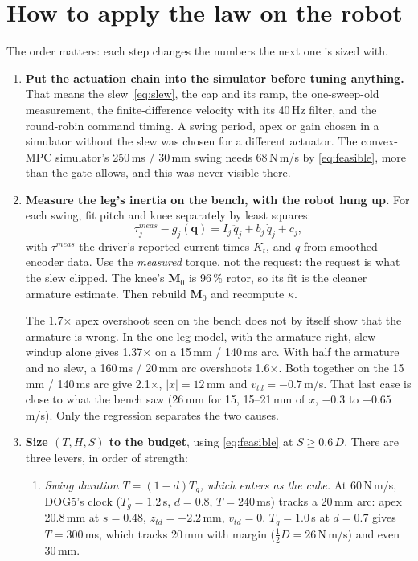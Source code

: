 \documentclass[11pt,a4paper]{article}
\newcommand{\Mmat}{\mathbf{M}}
\newcommand{\vq}{\mathbf{q}}
\newcommand{\Nms}{\,N\,m/s}
\begin{document}
\section{How to apply the law on the robot}
\label{sec:method}

The order matters: each step changes the numbers the next one is sized with.

\begin{enumerate}[leftmargin=1.6em, label=\textbf{Step \arabic*.}, ref=\arabic*]

\item \label{step:sim}\textbf{Put the actuation chain into the simulator
before tuning anything.} That means the slew~\eqref{eq:slew}, the cap and its
ramp, the one-sweep-old measurement, the finite-difference velocity with its
40\,Hz filter, and the round-robin command timing. A swing period, apex or
gain chosen in a simulator without the slew was chosen for a different
actuator. The convex-MPC simulator's 250\,ms / 30\,mm swing needs 68\Nms{} by
\eqref{eq:feasible}, more than the gate allows, and this was never visible
there.

\item \label{step:ident}\textbf{Measure the leg's inertia on the bench, with
the robot hung up.} For each swing, fit pitch and knee separately by least
squares:
\[
\tau^{meas}_j - g_j(\vq) = I_j\,\ddot q_j + b_j\,\dot q_j + c_j ,
\]
with $\tau^{meas}$ the driver's reported current times $K_t$, and $\ddot q$
from smoothed encoder data. Use the \emph{measured} torque, not the request:
the request is what the slew clipped. The knee's $\Mmat_0$ is 96\,\% rotor,
so its fit is the cleaner armature estimate. Then rebuild $\Mmat_0$ and
recompute $\kappa$.

The 1.7$\times$ apex overshoot seen on the bench does not by itself show
that the armature is wrong. In the one-leg model, with the armature right,
slew windup alone gives 1.37$\times$ on a 15\,mm / 140\,ms arc. With half
the armature and no slew, a 160\,ms / 20\,mm arc overshoots 1.6$\times$. Both
together on the 15\,mm / 140\,ms arc give 2.1$\times$, $|x| = 12$\,mm and $v_{td} = -0.7$\,m/s. That last case is close
to what the bench saw (26\,mm for 15, 15--21\,mm of $x$, $-0.3$ to
$-0.65$\,m/s). Only the regression separates the two causes.

\item \label{step:size}\textbf{Size $(T, H, S)$ to the budget}, using
\eqref{eq:feasible} at $S \ge 0.6\,D$. There are three levers, in order of
strength:
\begin{enumerate}[label=(\alph*), leftmargin=1.4em]
\item \emph{Swing duration $T = (1-d)T_g$, which enters as the cube.} At
60\Nms, DOG5's clock ($T_g = 1.2$\,s, $d = 0.8$, $T = 240$\,ms) tracks a
20\,mm arc: apex 20.8\,mm at $s = 0.48$, $z_{td} = -2.2$\,mm, $v_{td} = 0$.
$T_g = 1.0$\,s at $d = 0.7$ gives $T = 300$\,ms, which tracks 20\,mm with
margin ($\tfrac12 D = 26$\Nms) and even 30\,mm.


\end{enumerate}
\end{enumerate}
\end{document}
